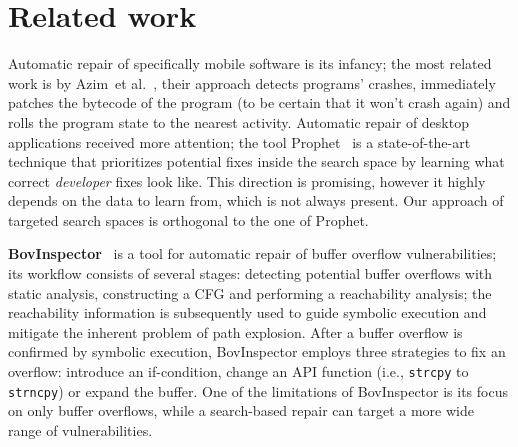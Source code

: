 \section{Related work}

Automatic repair of specifically mobile software is its infancy; the most related work is by Azim~et al.~\cite{azim2014towards}, their approach detects programs' crashes, immediately patches the bytecode of the program (to be certain that it won't crash again) and rolls the program state to the nearest activity.
Automatic repair of desktop applications received more attention; the tool Prophet~\cite{long2015prophet} is a state-of-the-art technique that prioritizes potential fixes inside the search space by learning what correct \emph{developer} fixes look like.
This direction is promising, however it highly depends on the data to learn from, which is not always present.
Our approach of targeted search spaces is orthogonal to the one of Prophet.

\textbf{BovInspector}~\cite{bovinspector} is a tool for automatic repair of buffer overflow vulnerabilities; its workflow consists of several stages: detecting potential buffer overflows with static analysis, constructing a CFG and performing a reachability analysis; the reachability information is subsequently used to guide symbolic execution and mitigate the inherent problem of path explosion.
After a buffer overflow is confirmed by symbolic execution, BovInspector employs three strategies to fix an overflow: introduce an if-condition, change an API function (i.e., \texttt{strcpy} to \texttt{strncpy}) or expand the buffer.
One of the limitations of BovInspector is its focus on only buffer overflows, while a search-based repair can target a more wide range of vulnerabilities.


